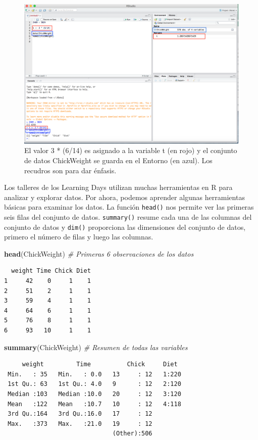 \documentclass[12pt,spanish,]{book}
\newenvironment{Shaded}{\begin{snugshade}}{\end{snugshade}}
\newcommand{\CommentTok}[1]{\textcolor[rgb]{0.56,0.35,0.01}{\textit{#1}}}
\newcommand{\KeywordTok}[1]{\textcolor[rgb]{0.13,0.29,0.53}{\textbf{#1}}}
\newcommand{\NormalTok}[1]{#1}
\begin{document}
\begin{figure}
\includegraphics[width=0.6\linewidth]{Images/save_data} \caption{El valor 3 * (6/14) es asignado a la variable t (en rojo) y el conjunto de datos ChickWeight se guarda en el Entorno (en azul). Los recudros son para dar énfasis.}\label{fig:savedata}
\end{figure}

Los talleres de los Learning Days utilizan muchas herramientas en R para analizar y explorar datos. Por ahora, podemos aprender algunas herramientas básicas para examinar los datos. La función \texttt{head()} nos permite ver las primeras seis filas del conjunto de datos. \texttt{summary()} resume cada una de las columnas del conjunto de datos y \texttt{dim()} proporciona las dimensiones del conjunto de datos, primero el número de filas y luego las columnas.

\begin{Shaded}
\begin{Highlighting}[]
\KeywordTok{head}\NormalTok{(ChickWeight) }\CommentTok{# Primeras 6 observaciones de los datos}
\end{Highlighting}
\end{Shaded}

\begin{verbatim}
  weight Time Chick Diet
1     42    0     1    1
2     51    2     1    1
3     59    4     1    1
4     64    6     1    1
5     76    8     1    1
6     93   10     1    1
\end{verbatim}

\begin{Shaded}
\begin{Highlighting}[]
\KeywordTok{summary}\NormalTok{(ChickWeight) }\CommentTok{# Resumen de todas las variables}
\end{Highlighting}
\end{Shaded}

\begin{verbatim}
     weight         Time          Chick     Diet   
 Min.   : 35   Min.   : 0.0   13     : 12   1:220  
 1st Qu.: 63   1st Qu.: 4.0   9      : 12   2:120  
 Median :103   Median :10.0   20     : 12   3:120  
 Mean   :122   Mean   :10.7   10     : 12   4:118  
 3rd Qu.:164   3rd Qu.:16.0   17     : 12          
 Max.   :373   Max.   :21.0   19     : 12          
                              (Other):506          
\end{verbatim}
\end{document}
